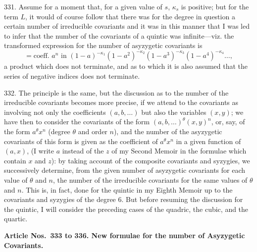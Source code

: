\documentclass[11pt,a4paper]{article}
\begin{document}
331. Assume for a moment that, for a given value of $s$, $\kappa_{s}$ is positive; but for the term $L$, it would of course follow that there was for the degree in question a certain number of irreducible covariants and it was in this manner that I was led to infer that the number of the covariants of a quintic was infinite---viz. the transformed expression for the number of asyzygetic covariants is
\[
= \text{coeff. } a^{n} \text{ in } (1-a)^{-\kappa_{1}}(1-a^{2})^{-\kappa_{2}}(1-a^{3})^{-\kappa_{3}}(1-a^{4})^{-\kappa_{4}}\ldots,
\]
a product which does not terminate, and as to which it is also assumed that the series of negative indices does not terminate.

332. The principle is the same, but the discussion as to the number of the irreducible covariants becomes more precise, if we attend to the covariants as involving not only the coefficients $(a, b, \ldots)$ but also the variables $(x, y)$; we have then to consider the covariants of the form $(a, b, \ldots)^{\theta}(x, y)^{n}$, or, say, of the form $a^{\theta}x^{n}$ (degree $\theta$ and order $n$), and the number of the asyzygetic covariants of this form is given as the coefficient of $a^{\theta}x^{n}$ in a given function of $(a, x)$, (I write $a$ instead of the $z$ of my Second Memoir in the formulae which contain $x$ and $z$): by taking account of the composite covariants and syzygies, we successively determine, from the given number of asyzygetic covariants for each value of $\theta$ and $n$, the number of the irreducible covariants for the same values of $\theta$ and $n$. This is, in fact, done for the quintic in my Eighth Memoir up to the covariants and syzygies of the degree 6. But before resuming the discussion for the quintic, I will consider the preceding cases of the quadric, the cubic, and the quartic.

\newpage
\setcounter{page}{338}

\textbf{Article Nos.\ 333 to 336. New formulae for the number of Asyzygetic Covariants.}
\end{document}
